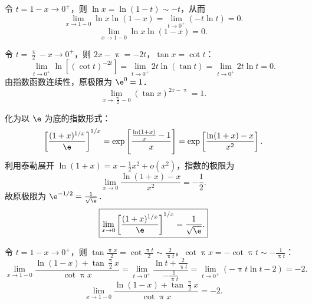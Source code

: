 \begin{solution}

    令 $t = 1 - x \to 0^+$，则 $\ln x = \ln(1 - t) \sim -t$，从而
    \begin{equation}
        \lim_{x\to 1-0} \ln x \ln(1 - x) = \lim_{t\to 0^+} (-t \ln t) = 0.
    \end{equation}
    \begin{equation}
        \boxed{\lim_{x\to 1-0} \ln x \ln(1 - x) = 0.}
    \end{equation}


    令 $t = \frac{\uppi}{2} - x \to 0^+$，则 $2x - \uppi = -2t$，$\tan x = \cot t$：
    \begin{equation}
        \lim_{t\to 0^+} \ln\left[ (\cot t)^{-2t} \right] = \lim_{t\to 0^+} 2t \ln(\tan t) = \lim_{t\to 0^+} 2t \ln t = 0.
    \end{equation}
    由指数函数连续性，原极限为 $\e^0 = 1$．
    \begin{equation}
        \boxed{\lim_{x\to \frac{\uppi}{2}-0} (\tan x)^{2x - \uppi} = 1.}
    \end{equation}


    化为以 $\e$ 为底的指数形式：
    \begin{equation}
        \left[ \frac{(1+x)^{1/x}}{\e} \right]^{1/x} = \exp\left[ \frac{\frac{\ln(1+x)}{x} - 1}{x} \right] = \exp\left[ \frac{\ln(1+x) - x}{x^2} \right].
    \end{equation}
    利用泰勒展开 $\ln(1+x) = x - \frac{1}{2}x^2 + o(x^2)$，指数的极限为
    \begin{equation}
        \lim_{x\to 0} \frac{\ln(1+x) - x}{x^2} = -\frac{1}{2}.
    \end{equation}
    故原极限为 $\e^{-1/2} = \frac{1}{\sqrt{\e}}$．
    \begin{equation}
        \boxed{\lim_{x\to 0} \left[ \frac{(1+x)^{1/x}}{\e} \right]^{1/x} = \frac{1}{\sqrt{\e}}.}
    \end{equation}


    令 $t = 1 - x \to 0^+$，则 $\tan\frac{\uppi x}{2} = \cot\frac{\uppi t}{2} \sim \frac{2}{\uppi t}$，$\cot \uppi x = -\cot \uppi t \sim -\frac{1}{\uppi t}$：
    \begin{equation}
        \lim_{x\to 1-0} \frac{\ln(1-x) + \tan \frac{\uppi}{2}x}{\cot \uppi x} = \lim_{t\to 0^+} \frac{\ln t + \frac{2}{\uppi t}}{-\frac{1}{\uppi t}} = \lim_{t\to 0^+} (-\uppi t \ln t - 2) = -2.
    \end{equation}
    \begin{equation}
        \boxed{\lim_{x\to 1-0} \frac{\ln(1-x) + \tan \frac{\uppi}{2}x}{\cot \uppi x} = -2.}
    \end{equation}


\end{solution}
